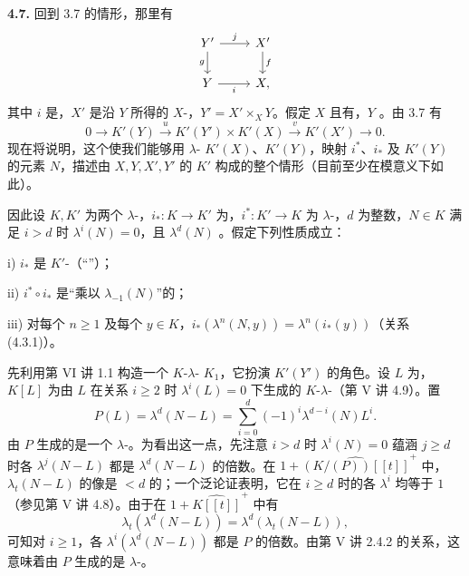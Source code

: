 \textbf{4.7.} 回到 3.7 的情形，那里有
\[
\begin{tikzcd}
Y'\arrow[r,"j"]\arrow[d,"g"']&X'\arrow[d,"f"]\\
Y\arrow[r,"i"']&X,
\end{tikzcd}
\]
其中 $i$ 是，$X'$ 是沿 $Y$ 所得的 $X$-，$Y'=X'\times_XY$。假定 $X$ 且有，$Y$ 。由 3.7 有
\[
0\longrightarrow K'(Y)\xrightarrow{u}K'(Y')\times K'(X)\xrightarrow{v}K'(X')\longrightarrow0.
\]
现在将说明，这个使我们能够用 $\lambda$- $K'(X)$、$K'(Y)$，映射 $i^*$、$i_*$ 及 $K'(Y)$ 的元素 $N$，描述由 $X,Y,X',Y'$ 的 $K'$ 构成的整个情形（目前至少在模意义下如此）。

因此设 $K,K'$ 为两个 $\lambda$-，$i_*:K\to K'$ 为，$i^*:K'\to K$ 为 $\lambda$-，$d$ 为整数，$N\in K$ 满足 $i>d$ 时 $\lambda^i(N)=0$，且 $\lambda^d(N)$ 。假定下列性质成立：

 i) $i_*$ 是 $K'$-（“”）；

 ii) $i^*\circ i_*$ 是“乘以 $\lambda_{-1}(N)$”的；

 iii) 对每个 $n\geq1$ 及每个 $y\in K$，$i_*(\lambda^n(N,y))=\lambda^n(i_*(y))$（关系 (4.3.1)）。

先利用第 VI 讲 1.1 构造一个 $K$-$\lambda$- $K_1$，它扮演 $K'(Y')$ 的角色。设 $L$ 为，$K[L]$ 为由 $L$ 在关系 $i\geq2$ 时 $\lambda^i(L)=0$ 下生成的 $K$-$\lambda$-（第 V 讲 4.9）。置
\[
P(L)=\lambda^d(N-L)=\sum_{i=0}^d(-1)^i\lambda^{d-i}(N)L^i.
\]
由 $P$ 生成的是一个 $\lambda$-。为看出这一点，先注意 $i>d$ 时 $\lambda^i(N)=0$ 蕴涵 $j\geq d$ 时各 $\lambda^j(N-L)$ 都是 $\lambda^d(N-L)$ 的倍数。在 $1+\widehat{(K/(P))[[t]]}^{+}$ 中，$\lambda_t(N-L)$ 的像是 $<d$ 的；一个泛论证表明，它在 $i\geq d$ 时的各 $\lambda^i$ 均等于 $1$（参见第 V 讲 4.8）。由于在 $1+\widehat{K[[t]]}^{+}$ 中有
\[
\lambda_t(\lambda^d(N-L))=\lambda^d(\lambda_t(N-L)),
\]
可知对 $i\geq1$，各 $\lambda^i(\lambda^d(N-L))$ 都是 $P$ 的倍数。由第 V 讲 2.4.2 的关系，这意味着由 $P$ 生成的是 $\lambda$-。

